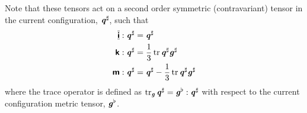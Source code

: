 Note that these tensors act on a second order symmetric (contravariant) tensor
in the current configuration, $ \boldsymbol{\mathit{q}}^{\sharp} $, such that
\begin{align}
  \doubledotprod{\spatialsymidentitytensorfour}{\sharptensor{\tensortwo{q}}}&=\sharptensor{\tensortwo{q}}
  \\ \doubledotprod{\spatialsphericaltensorfour}{\sharptensor{\tensortwo{q}}}&=\dfrac{1}{3}\trace{}{\sharptensor{\tensortwo{q}}}\sharptensor{\tensortwo{g}}
  \\ \doubledotprod{\spatialdeviatorictensorfour}{\sharptensor{\tensortwo{q}}}&=\sharptensor{\tensortwo{q}}-\dfrac{1}{3}\trace{}{\sharptensor{\tensortwo{q}}}\sharptensor{\tensortwo{g}}
\end{align}
where the trace operator is defined as $\trace{\tensortwo{g}}{\sharptensor{\tensortwo{q}}}=\doubledotprod{\flattensor{\tensortwo{g}}}{\sharptensor{\tensortwo{q}}}$ \ie
with respect to the current configuration metric tensor, $\boldsymbol{\mathit{g}}^{\flat}$.


